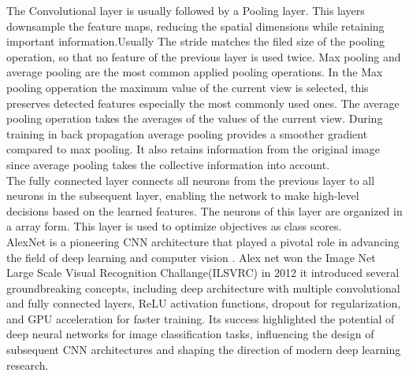\documentclass[
a4paper, 
12pt,
grayscalebody, %
abstract=on,
twoside, BCOR10mm, 12pt, DIV13,headinclude, footexclude, final, abstracton, openright
]{ibireprt}
\numberwithin{equation}{chapter}
\numberwithin{table}{chapter}
\numberwithin{figure}{chapter}
\numberwithin{algorithm}{chapter}
\numberwithin{example}{chapter}
\numberwithin{example}{chapter}
\begin{document}
The Convolutional layer is usually followed by a Pooling layer. This  layers downsample the feature maps, reducing the spatial dimensions while retaining important information.Usually The stride matches the filed size of the pooling operation, so that no feature of the previous layer is used twice. Max pooling and average pooling are the most common applied pooling operations. In the Max pooling opperation the maximum value of the current view is selected, this preserves detected features especially the most commonly used ones. The average pooling operation takes the averages of the values of the current view. During training in back propagation average pooling provides a smoother gradient compared to max pooling. It also retains information from the original image since average pooling takes the collective information into account. \\ 

The fully connected layer connects all neurons from the previous layer to all neurons in the subsequent layer, enabling the network to make high-level decisions based on the learned features. The neurons of this layer are organized in a array form. This layer is used to optimize objectives as class scores.\\

AlexNet is a pioneering CNN architecture that played a pivotal role in advancing the field of deep learning and computer vision \cite{Alzubaidi2021}. Alex net won the Image Net Large Scale Visual Recognition Challange(ILSVRC) in 2012 it introduced several groundbreaking concepts, including deep architecture  with multiple convolutional and fully connected layers, ReLU activation functions, dropout for regularization, and GPU acceleration for faster training. Its success highlighted the potential of deep neural networks for image classification tasks, influencing the design of subsequent CNN architectures and shaping the direction of modern deep learning research.
\end{document}
